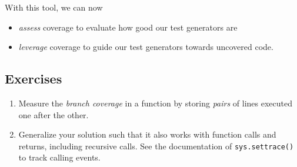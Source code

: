\documentclass[10pt,parskip=half,
	toc=sectionentrywithdots,
	bibliography=totocnumbered,
	captions=tableheading,numbers=noendperiod]{scrartcl}
\providecommand{\tightlist}{%
  \setlength{\itemsep}{0pt}\setlength{\parskip}{0pt}}
\begin{document}
With this tool, we can now

\begin{itemize}
\tightlist
\item
  \emph{assess} coverage to evaluate how good our test generators are
\item
  \emph{leverage} coverage to guide our test generators towards
  uncovered code.
\end{itemize}

\subsection{Exercises}\label{exercises}

\begin{enumerate}
\def\labelenumi{\arabic{enumi}.}
\tightlist
\item
  Measure the \emph{branch coverage} in a function by storing
  \emph{pairs} of lines executed one after the other.
\item
  Generalize your solution such that it also works with function calls
  and returns, including recursive calls. See the documentation of
  \texttt{sys.settrace()} to track calling events.
\end{enumerate}




	
\end{document}
